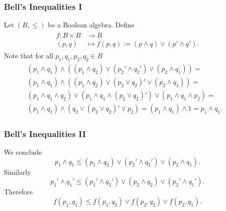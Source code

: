 \documentclass{beamer}
\begin{document}
\begin{frame}

	\frametitle{Bell's Inequalities I}
	
	Let $(B,\leq)$ be a Boolean algebra. Define
	\begin{align}
	\begin{split}
		f:B\times B&\rightarrow B\\
		(p,q)&\mapsto f(p,q):=(p\wedge q)\vee(p'\wedge q').
	\end{split}
	\end{align}
	Note that for all $p_1,q_1,p_2,q_2\in B$
	\begin{align}
	\begin{split}
		(p_1\wedge q_1)\wedge((p_1\wedge q_2)\vee(p_2'\wedge q_2')\vee(p_2\wedge q_1))=&\\
		(p_1\wedge q_1)\wedge((p_1\wedge q_2)\vee(p_2\vee q_2)'\vee(p_2\wedge q_1))=&\\
		(p_1\wedge q_1\wedge q_2)\vee(p_1\wedge q_1\wedge (p_2\vee q_2)')\vee(p_1\wedge q_1\wedge p_2)=&\\
		(p_1\wedge q_1)\wedge(q_2\vee(p_2\vee q_2)'\vee p_2)=(p_1\wedge q_1)\wedge 1=p_1\wedge q_1.&
	\end{split}
	\end{align}

\end{frame}
	
\begin{frame}
	
	\frametitle{Bell's Inequalities II}
	
	We conclude
	\begin{equation}
		p_1\wedge q_1\leq(p_1\wedge q_2)\vee(p_2'\wedge q_2')\vee(p_2\wedge q_1). 
	\end{equation}	
	Similarly
	\begin{equation}
		p_1'\wedge q_1'\leq(p_1'\wedge q_2')\vee(p_2\wedge q_2)\vee(p_2'\wedge q_1').
	\end{equation}
	Therefore
	\begin{equation}
		f(p_1,q_1)\leq f(p_1,q_2)\vee f(p_2,q_2)\vee f(p_2,q_1).
	\end{equation}	 
	
\end{frame}		
\end{document}
